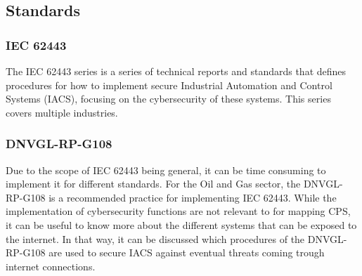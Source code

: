 \subsection{Standards} \label{sec:standards}
\subsubsection{IEC 62443} \label{sec:IEC62443}
The IEC 62443 series is a series of technical reports and standards that defines procedures for how to implement secure Industrial Automation and Control Systems (IACS), focusing on the cybersecurity of these systems. This series covers multiple industries.

\subsubsection{DNVGL-RP-G108} \label{sec:G108}
Due to the scope of IEC 62443 being general, it can be time consuming to implement it for different standards.
For the Oil and Gas sector, the DNVGL-RP-G108 is a recommended practice for implementing IEC 62443. While the implementation of cybersecurity functions are not relevant to for mapping CPS, it can be useful to know more about the different systems that can be exposed to the internet. In that way, it can be discussed which procedures of the DNVGL-RP-G108 are used to secure IACS against eventual threats coming trough internet connections.
